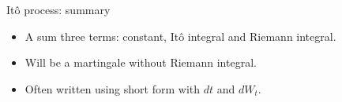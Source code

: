 \begin{frame}{Itô process: summary}
        
\begin{itemize}[<+->]
          \item A \alert{sum three terms}: constant, Itô integral and Riemann integral.
          \item Will be a martingale \alert{without Riemann integral}.
          \item Often written using \alert{short form} with $dt$ and $dW_t$.
\end{itemize}
        
\end{frame}
      
